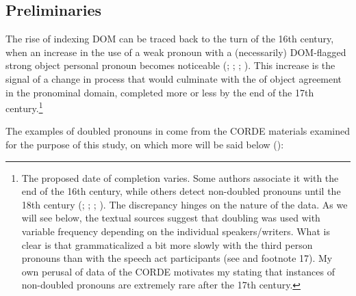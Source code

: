 \documentclass[output=paper]{LSP/langsci}
\begin{document}
\subsection{Preliminaries}\label{04-me-sec:4.1}

The rise of  indexing DOM can be traced back to the turn of the 16th century, when an increase in the use of a weak pronoun with a (necessarily) DOM-flagged strong object personal pronoun becomes noticeable (\citealt[83]{Keniston1937Syntax}; \citealt{Silva-Corvalan1984Semantic}; \citealt{Rini1990Dating}; \citealt{Gabrieletal2010Information}). This increase is the signal of a change in process that would culminate with the  of object agreement in the pronominal domain, completed more or less by the end of the 17th century.\footnote{The proposed date of completion varies. Some authors associate it with the end of the 16th century, while others detect non-doubled pronouns until the 18th century (\citealt{Silva-Corvalan1984Semantic}; \citealt{Rini1990Dating}; \citealt{Gabrieletal2010Information}; \citealt{Rozasetal2012Object}). The discrepancy hinges on the nature of the data. As we will see below, the textual sources suggest that doubling was used with variable frequency depending on the individual speakers/writers. What is clear is that  grammaticalized a bit more slowly with the third person pronouns than with the speech act participants (see  and footnote 17). 
My own perusal of data of the CORDE motivates my stating that instances of non-doubled pronouns are extremely rare after the 17th century.} 

 The examples of doubled pronouns in  come from the CORDE materials examined for the purpose of this study, on which more will be said below ():
\end{document}
